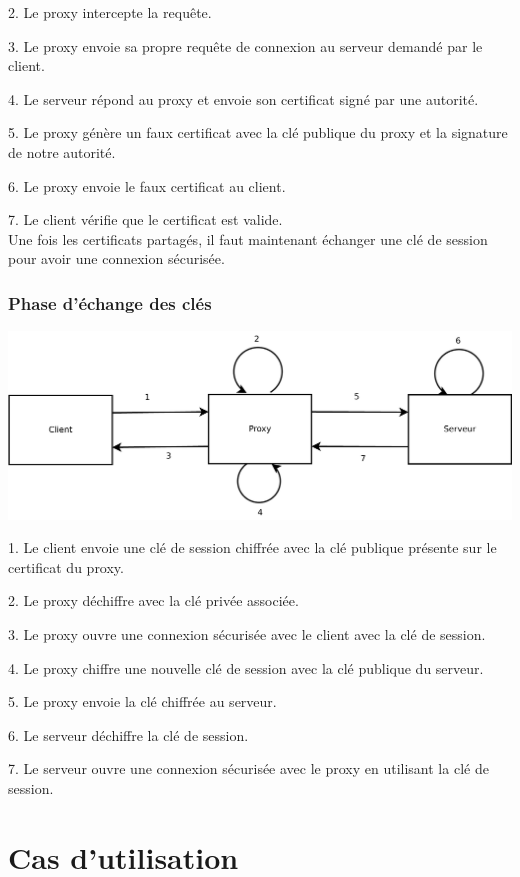 \documentclass[a4paper,11pt,french]{article}
\begin{document}
2. Le proxy intercepte la requête.

3. Le proxy envoie sa propre requête de connexion au serveur demandé par le client.

4. Le serveur répond au proxy et envoie son certificat signé par une autorité.

5. Le proxy génère un faux certificat avec la clé publique du proxy et la signature de notre autorité.

6. Le proxy envoie le faux certificat au client.

7. Le client vérifie que le certificat est valide.\\

Une fois les certificats partagés, il faut maintenant échanger une clé de session pour avoir une connexion sécurisée.

\subsubsection{Phase d'échange des clés}

\begin{center}
\includegraphics[width=\textwidth]{images/Cles.pdf}
\end{center}


1. Le client envoie une clé de session chiffrée avec la clé publique présente sur le certificat du proxy.

2. Le proxy déchiffre avec la clé privée associée.

3. Le proxy ouvre une connexion sécurisée avec le client avec la clé de session.

4. Le proxy chiffre une nouvelle clé de session avec la clé publique du serveur.

5. Le proxy envoie la clé chiffrée au serveur.

6. Le serveur déchiffre la clé de session.

7. Le serveur ouvre une connexion sécurisée avec le proxy en utilisant la clé de session.


\section{Cas d'utilisation}
\end{document}
